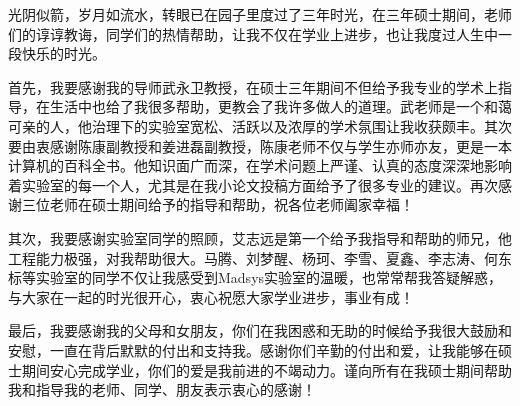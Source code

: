 \begin{acknowledgement}
	光阴似箭，岁月如流水，转眼已在园子里度过了三年时光，在三年硕士期间，老师们的谆谆教诲，同学们的热情帮助，让我不仅在学业上进步，也让我度过人生中一段快乐的时光。
	
	首先，我要感谢我的导师武永卫教授，在硕士三年期间不但给予我专业的学术上指导，在生活中也给了我很多帮助，更教会了我许多做人的道理。武老师是一个和蔼可亲的人，他治理下的实验室宽松、活跃以及浓厚的学术氛围让我收获颇丰。其次要由衷感谢陈康副教授和姜进磊副教授，陈康老师不仅与学生亦师亦友，更是一本计算机的百科全书。他知识面广而深，在学术问题上严谨、认真的态度深深地影响着实验室的每一个人，尤其是在我小论文投稿方面给予了很多专业的建议。再次感谢三位老师在硕士期间给予的指导和帮助，祝各位老师阖家幸福！
	
	其次，我要感谢实验室同学的照顾，艾志远是第一个给予我指导和帮助的师兄，他工程能力极强，对我帮助很大。马腾、刘梦醒、杨珂、李雪、夏鑫、李志涛、何东标等实验室的同学不仅让我感受到Madsys实验室的温暖，也常常帮我答疑解惑，与大家在一起的时光很开心，衷心祝愿大家学业进步，事业有成！
	
	最后，我要感谢我的父母和女朋友，你们在我困惑和无助的时候给予我很大鼓励和安慰，一直在背后默默的付出和支持我。感谢你们辛勤的付出和爱，让我能够在硕士期间安心完成学业，你们的爱是我前进的不竭动力。谨向所有在我硕士期间帮助我和指导我的老师、同学、朋友表示衷心的感谢！
	
\end{acknowledgement}
